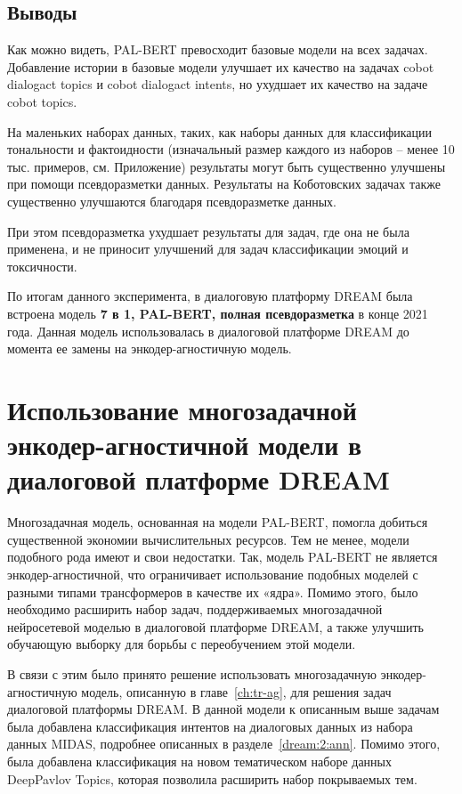 \subsection{Выводы}
Как можно видеть, PAL-BERT превосходит базовые модели на всех задачах. Добавление истории в базовые модели улучшает их качество на задачах cobot dialogact topics и cobot dialogact intents, но ухудшает их качество на задаче cobot topics.

На маленьких наборах данных, таких, как наборы данных для классификации тональности и фактоидности (изначальный размер каждого из наборов -- менее 10 тыс. примеров, см. Приложение) результаты могут быть существенно улучшены при помощи псевдоразметки данных. Результаты на Коботовских задачах также существенно улучшаются благодаря псевдоразметке данных.

При этом псевдоразметка ухудшает результаты для задач, где она не была применена, и не приносит улучшений для задач классификации эмоций и токсичности.

По итогам данного эксперимента, в диалоговую платформу {DREAM} была встроена модель \textbf{7 в 1, PAL-BERT, полная псевдоразметка} в конце 2021 года. Данная модель использовалась в диалоговой платформе {DREAM} до момента ее замены на энкодер-агностичную модель.

\section{Использование многозадачной энкодер-агностичной модели в диалоговой платформе DREAM}

Многозадачная модель, основанная на модели PAL-BERT, помогла добиться существенной экономии вычислительных ресурсов. Тем не менее, модели подобного рода имеют и свои недостатки. Так, модель PAL-BERT не является энкодер-агностичной, что ограничивает использование подобных моделей с разными типами трансформеров в качестве их «ядра». Помимо этого, было необходимо расширить набор задач, поддерживаемых многозадачной нейросетевой моделью в диалоговой платформе DREAM, а также улучшить обучающую выборку для борьбы с переобучением этой модели.

В связи с этим было принято решение использовать многозадачную энкодер-агностичную модель, описанную в главе~\ref{ch:tr-ag}, для решения задач диалоговой платформы DREAM. В данной модели к описанным выше задачам была добавлена классификация интентов на диалоговых данных из набора данных MIDAS, подробнее описанных в разделе~\ref{dream:2:ann}. Помимо этого, была добавлена классификация на новом тематическом наборе данных DeepPavlov Topics\cite{dp_topics}, которая позволила расширить набор покрываемых тем.

